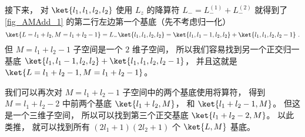 接下来， 对 $\ket{l_1, l_1, l_2, l_2}$ 使用 $L_z$ 的降算符 $L_- = L_-^{(1)} + L_-^{(2)}$ 就得到了\autoref{fig_AMAdd_1} 的第二行左边第一个基底（先不考虑归一化）
\begin{equation}
\ket{L = l_1 + l_2, M = l_1 + l_2 - 1} = L_- \ket{l_1, l_1, l_2, l_2} = \ket{l_1, l_1 - 1, l_2, l_2} + \ket{l_1, l_1, l_2, l_2 - 1}~.
\end{equation}
但 $M = l_1 + l_2 - 1$ 子空间是一个 $2$ 维子空间， 所以我们容易找到另一个正交归一基底 $\ket{l_1, l_1 - 1, l_2, l_2} + \ket{l_1, l_1, l_2, l_2 - 1}$， 并且这就是 $\ket{L = l_1 + l_2 - 1, M = l_1 + l_2 - 1}$。

我们可以再次对 $M = l_1 + l_2 - 1$ 子空间中的两个基底使用将算符， 得到 $M = l_1 + l_2 - 2$ 中前两个基底 $\ket{l_1 + l_2, M}$， 和 $\ket{l_1 + l_2 - 1, M}$。 但这是一个三维子空间， 所以可以找到第三个正交基底 $\ket{l_1 + l_2 - 2, M}$。 以此类推， 就可以找到所有 $(2l_1+1)(2l_2+1)$ 个 $\ket{L,M}$ 基底。
